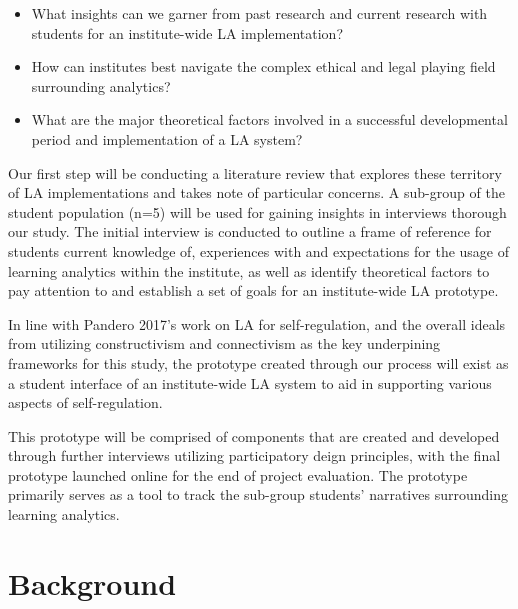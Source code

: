 \documentclass{l4proj}
\begin{document}
\begin{itemize}
    \item What insights can we garner from past research and current research with students for an institute-wide LA implementation?
    \item How can institutes best navigate the complex ethical and legal playing field surrounding analytics?
    \item What are the major theoretical factors involved in a successful developmental period and implementation of a LA system? 
    
\end{itemize}


Our first step will be conducting a literature review that explores these territory of LA implementations and takes note of particular concerns. A sub-group of the student population (n=5) will be used for gaining insights in interviews thorough our study. The initial interview is conducted to outline a frame of reference for students current knowledge of, experiences with and expectations for the usage of learning analytics within the institute, as well as identify theoretical factors to pay attention to and establish a set of goals for an institute-wide LA prototype. 

In line with Pandero 2017’s work on LA for self-regulation, and the overall ideals from utilizing constructivism and connectivism as the key underpining frameworks for this study, the prototype created through our process will exist as a student interface of an institute-wide LA system to aid in supporting various aspects of self-regulation.

This prototype will be comprised of components that are created and developed through further interviews utilizing participatory deign principles, with the final prototype launched online for the end of project evaluation. The prototype primarily serves as a tool to track the sub-group students' narratives surrounding learning analytics. 


    

\chapter{Background}
\end{document}
